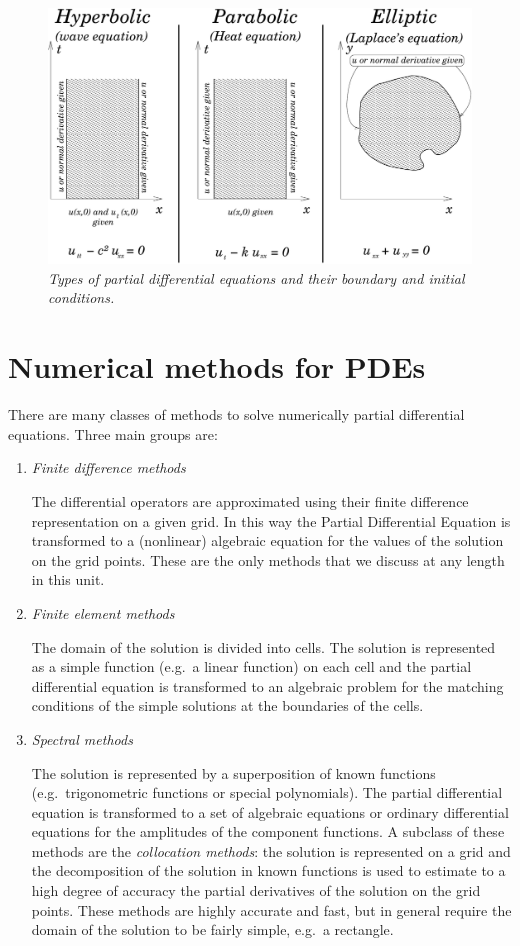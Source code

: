 \begin{figure}
  \centerline{\includegraphics[width=120mm]{figures/pde_summary}}
  \caption{\label{fig:pde_summary} \it Types of partial differential
    equations and their boundary and initial conditions.}
\end{figure}

\section{Numerical methods for PDEs}

There are many classes of methods to solve numerically partial
differential equations.  Three main groups are:

\begin{enumerate}
\item \textit{Finite difference methods}

  The differential operators are approximated using their finite
  difference representation on a given grid.  In this way the Partial
  Differential Equation is transformed to a (nonlinear) algebraic
  equation for the values of the solution on the grid points.  These
  are the only methods that we discuss at any length in this unit.
\item \textit{Finite element methods}

  The domain of the solution is divided into cells.  The solution is
  represented as a simple function (e.g.\ a linear function) on each
  cell and the partial differential equation is transformed to an
  algebraic problem for the matching conditions of the simple
  solutions at the boundaries of the cells.
\item \textit{Spectral methods}

  The solution is represented by a superposition of known functions
  (e.g.\ trigonometric functions or special polynomials).  The partial
  differential equation is transformed to a set of algebraic equations
  or ordinary differential equations for the amplitudes of the
  component functions.  A subclass of these methods are the
  \textit{collocation methods}: the solution is represented on a grid
  and the decomposition of the solution in known functions is used to
  estimate to a high degree of accuracy the partial derivatives of the
  solution on the grid points.  These methods are highly accurate and
  fast, but in general require the domain of the solution to be fairly
  simple, e.g.\ a rectangle.
\end{enumerate}

